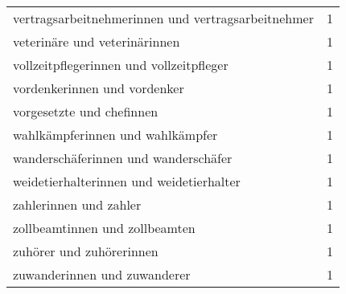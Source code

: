 \begin{tabular}{ll}
vertragsarbeitnehmerinnen und vertragsarbeitnehmer & 1\\
veterinäre und veterinärinnen & 1\\
vollzeitpflegerinnen und vollzeitpfleger & 1\\
vordenkerinnen und vordenker & 1\\
vorgesetzte und chefinnen & 1\\
wahlkämpferinnen und wahlkämpfer & 1\\
wanderschäferinnen und wanderschäfer & 1\\
weidetierhalterinnen und weidetierhalter & 1\\
zahlerinnen und zahler & 1\\
zollbeamtinnen und zollbeamten & 1\\
zuhörer und zuhörerinnen & 1\\
zuwanderinnen und zuwanderer & 1\\
\bottomrule
\end{tabular}